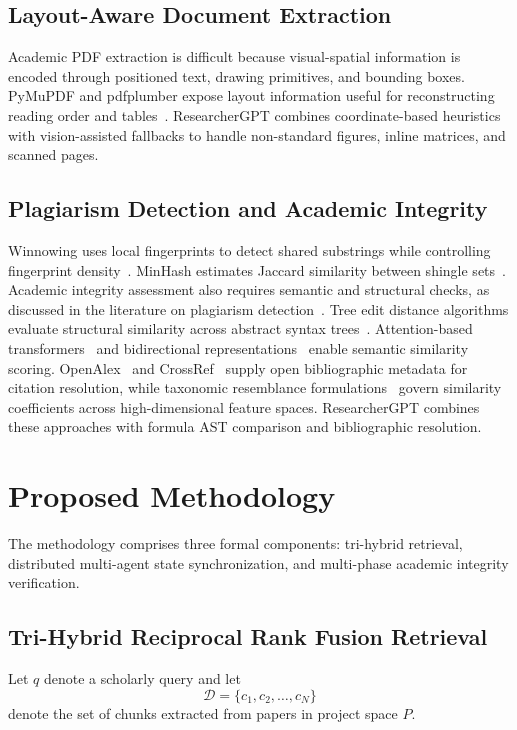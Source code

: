 \documentclass[conference]{IEEEtran}
\begin{document}
\subsection{Layout-Aware Document Extraction}
Academic PDF extraction is difficult because visual-spatial information is encoded through positioned text, drawing primitives, and bounding boxes. PyMuPDF and pdfplumber expose layout information useful for reconstructing reading order and tables~\cite{singer2023pdfplumber}. ResearcherGPT combines coordinate-based heuristics with vision-assisted fallbacks to handle non-standard figures, inline matrices, and scanned pages.

\subsection{Plagiarism Detection and Academic Integrity}
Winnowing uses local fingerprints to detect shared substrings while controlling fingerprint density~\cite{schleimer2003winnowing}. MinHash estimates Jaccard similarity between shingle sets~\cite{broder1997resemblance}. Academic integrity assessment also requires semantic and structural checks, as discussed in the literature on plagiarism detection~\cite{foltynek2019plagiarism}. Tree edit distance algorithms evaluate structural similarity across abstract syntax trees~\cite{zhang1989tree}. Attention-based transformers~\cite{vaswani2017attention} and bidirectional representations~\cite{devlin2019bert} enable semantic similarity scoring. OpenAlex~\cite{priem2022openalex} and CrossRef~\cite{hendricks2020crossref} supply open bibliographic metadata for citation resolution, while taxonomic resemblance formulations~\cite{sneath1973taxonomy} govern similarity coefficients across high-dimensional feature spaces. ResearcherGPT combines these approaches with formula AST comparison and bibliographic resolution.

\section{Proposed Methodology}
The methodology comprises three formal components: tri-hybrid retrieval, distributed multi-agent state synchronization, and multi-phase academic integrity verification.

\subsection{Tri-Hybrid Reciprocal Rank Fusion Retrieval}
Let $q$ denote a scholarly query and let
\begin{equation}
\mathcal{D} = \{c_1, c_2, \ldots, c_N\}
\label{eq:corpus}
\end{equation}
denote the set of chunks extracted from papers in project space $P$.
\end{document}
